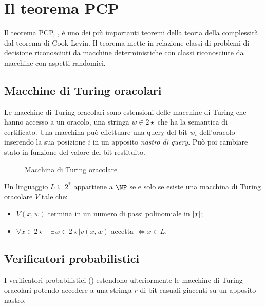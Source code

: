 


\section{Il teorema PCP}
Il teorema PCP, , è uno dei più importanti teoremi della teoria della complessità dal teorema di Cook-Levin.
Il teorema mette in relazione classi di problemi di decisione riconosciuti da macchine deterministiche con classi riconosciute da macchine con aspetti randomici.


\subsection{Macchine di Turing oracolari}
Le macchine di Turing oracolari sono estensioni delle macchine di Turing che hanno accesso a un oracolo, una stringa $w\in 2\star$ che ha la semantica di certificato.
Una macchina può effettuare una query del bit $w_i$ dell'oracolo inserendo la sua posizione $i$ in un apposito \emph{nastro di query}.
Può poi cambiare stato in funzione del valore del bit restituito.

\begin{figure}[ht]
	\centering
	
	\caption{Macchina di Turing oracolare}
	\label{fig:mdtoracle}
\end{figure}

\begin{defin}
	Un linguaggio $L\subseteq 2^*$ appartiene a $\NP$ se e solo se esiste una macchina di Turing oracolare $V$ tale che:
	\begin{itemize}
		\item $V(x,w)$ termina in un numero di passi polinomiale in $|x|$;
		\item $\forall x\in 2\star \quad \exists w\in 2\star \mid v(x,w)$ accetta $\iff x\in L$.
	\end{itemize}
\end{defin}


\subsection{Verificatori probabilistici}
I verificatori probabilistici () estendono ulteriormente le macchine di Turing oracolari potendo accedere a una stringa $r$ di bit casuali giacenti su un apposito nastro.

